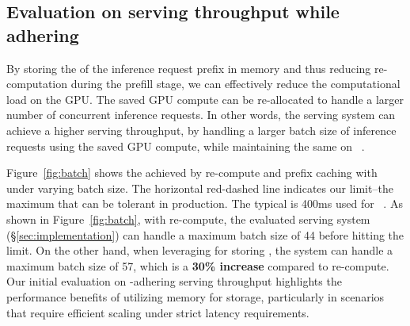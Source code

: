 \subsection{Evaluation on serving throughput while adhering \slo}
\label{sec:eval:throughput}

By storing the \kvcache of the inference request prefix in \cxl memory and thus reducing re-computation during the prefill stage, we can effectively reduce the computational load on the GPU.
The saved GPU compute can be re-allocated to handle a larger number of concurrent inference requests. 
In other words, the \llm serving system can achieve a higher serving throughput, by handling a larger batch size of inference requests using the saved GPU compute, while maintaining the same \slo on \ttft~\cite{distserve}.

Figure~\ref{fig:batch} shows the \ttft achieved by \kv re-compute and prefix caching with \cxl under varying batch size.
The horizontal red-dashed line indicates our \slo limit--the maximum \ttft that can be tolerant in production.
The typical \slo is 400ms used for ~\cite{ttft}.
As shown in Figure~\ref{fig:batch}, with \kv re-compute, the evaluated serving system (\S\ref{sec:implementation}) can handle a maximum batch size of 44 before hitting the \slo limit.
On the other hand, when leveraging \cxl for storing \kvcache, the system can handle a maximum batch size of 57, which is a \textbf{30\% increase} compared to \kv re-compute. 
Our initial evaluation on \slo-adhering serving throughput highlights the performance benefits of utilizing \cxl memory for \kvcache storage, particularly in scenarios that require efficient scaling under strict latency requirements.

